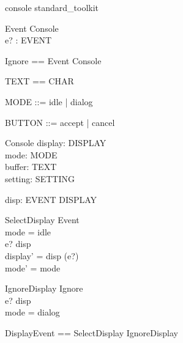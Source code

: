 \documentclass{llncs}
\begin{document}
\begin{zsection}
\SECTION console \parents standard\_toolkit
\end{zsection}

\begin{zed}
[EVENT]
\end{zed}
\begin{schema}{Event}
\Delta Console\\
e? : EVENT
\end{schema}
\begin{zed}
Ignore == Event \land \Xi Console
\end{zed}

\begin{zed}
\end{zed}
\begin{zed}
TEXT == \seq CHAR
\end{zed}
\begin{zed}
MODE ::= idle | dialog
\end{zed}
\begin{zed}
BUTTON ::= accept | cancel
\end{zed}
\begin{schema}{Console}
display: DISPLAY \\
mode: MODE \\
buffer: TEXT \\
setting: SETTING
\end{schema}

\begin{axdef}
disp: EVENT \pfun DISPLAY
\end{axdef}
\begin{schema}{SelectDisplay}
Event \\
\where mode = idle \\
e? \in \dom disp \\
display' = disp (e?) \\
mode' = mode
\end{schema}
\begin{schema}{IgnoreDisplay}
Ignore \\
\where e? \in \dom disp\\
mode = dialog
\end{schema}
\begin{zed}
DisplayEvent == SelectDisplay \lor IgnoreDisplay
\end{zed}
\end{document}
